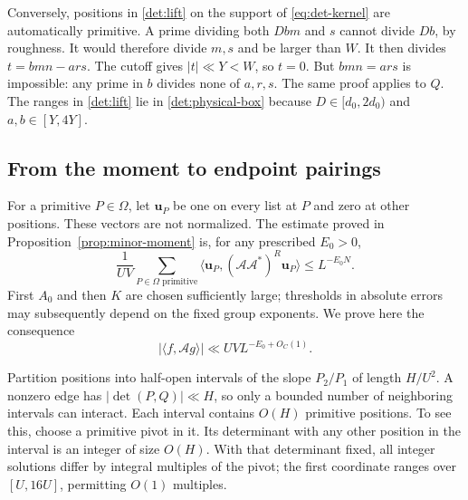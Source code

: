 Conversely, positions in \eqref{det:lift} on the support of
\eqref{eq:det-kernel} are automatically primitive.  A prime
dividing both $Dbm$ and $s$ cannot divide $Db$, by roughness.
It would therefore divide $m,s$ and be larger than $W$.  It then
divides $t=bmn-ars$.  The cutoff gives $|t|\ll Y<W$, so $t=0$.
But $bmn=ars$ is impossible: any prime in $b$ divides none of
$a,r,s$.  The same proof applies to $Q$.  The ranges in
\eqref{det:lift} lie in \eqref{det:physical-box} because
$D\in[d_0,2d_0)$ and $a,b\in[Y,4Y]$.

\subsection{From the moment to endpoint pairings}

For a primitive $P\in\Omega$, let $\mathbf u_P$ be one on every
list at $P$ and zero at other positions.  These vectors are not
normalized.  The estimate proved in
Proposition~\ref{prop:minor-moment} is, for any prescribed $E_0>0$,
\begin{equation}\label{eq:det-moment}
 \frac1{UV}\sum_{P\in\Omega\text{ primitive}}
       \langle\mathbf u_P,(\mathcal A\mathcal A^*)^R
                     \mathbf u_P\rangle
             \leq L^{-E_0N}.
\end{equation}
First $A_0$ and then $K$ are chosen sufficiently large; thresholds
in absolute errors may subsequently depend on the fixed group
exponents.  We prove here the consequence
\begin{equation}\label{eq:det-pairing}
 |\langle f,\mathcal A g\rangle|
             \ll UVL^{-E_0+O_C(1)}.
\end{equation}

Partition positions into half-open intervals of the slope $P_2/P_1$
of length $H/U^2$.  A nonzero edge has
$|\det(P,Q)|\ll H$, so only a bounded number of neighboring
intervals can interact.  Each interval contains $O(H)$ primitive
positions.  To see this, choose a primitive pivot in it.  Its
determinant with any other position in the interval is an integer
of size $O(H)$.  With that determinant fixed, all integer
solutions differ by integral multiples of the pivot; the first
coordinate ranges over $[U,16U]$, permitting $O(1)$ multiples.

